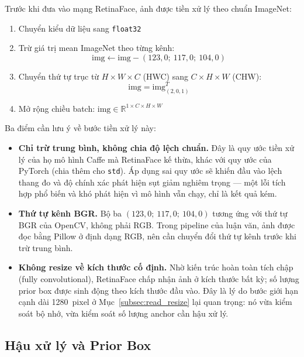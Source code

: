 Trước khi đưa vào mạng RetinaFace, ảnh được tiền xử lý theo chuẩn ImageNet:

\begin{enumerate}
    \item Chuyển kiểu dữ liệu sang \texttt{float32}
    \item Trừ giá trị mean ImageNet theo từng kênh:
    \begin{equation}
    \label{eq:imagenet_mean}
    \text{img} \leftarrow \text{img} - (123{,}0;\ 117{,}0;\ 104{,}0)
    \end{equation}
    \item Chuyển thứ tự trục từ $H \times W \times C$ (HWC) sang $C \times H \times W$ (CHW):
    \begin{equation}
    \label{eq:hwc2chw}
    \text{img} = \text{img}^{T}_{(2,0,1)}
    \end{equation}
    \item Mở rộng chiều batch: $\text{img} \in \mathbb{R}^{1 \times C \times H \times W}$
\end{enumerate}

Ba điểm cần lưu ý về bước tiền xử lý này:

\begin{itemize}
    \item \textbf{Chỉ trừ trung bình, không chia độ lệch chuẩn.} Đây là quy ước tiền xử lý của họ mô hình Caffe mà RetinaFace kế thừa, khác với quy ước của PyTorch (chia thêm cho \texttt{std}). Áp dụng sai quy ước sẽ khiến đầu vào lệch thang đo và độ chính xác phát hiện sụt giảm nghiêm trọng --- một lỗi tích hợp phổ biến và khó phát hiện vì mô hình vẫn chạy, chỉ là kết quả kém.
    \item \textbf{Thứ tự kênh BGR.} Bộ ba $(123{,}0;\ 117{,}0;\ 104{,}0)$ tương ứng với thứ tự BGR của OpenCV, không phải RGB. Trong pipeline của luận văn, ảnh được đọc bằng Pillow ở định dạng RGB, nên cần chuyển đổi thứ tự kênh trước khi trừ trung bình.
    \item \textbf{Không resize về kích thước cố định.} Nhờ kiến trúc hoàn toàn tích chập (fully convolutional), RetinaFace chấp nhận ảnh ở kích thước bất kỳ; số lượng prior box được sinh động theo kích thước đầu vào. Đây là lý do bước giới hạn cạnh dài 1280~pixel ở Mục~\ref{subsec:read_resize} lại quan trọng: nó vừa kiểm soát bộ nhớ, vừa kiểm soát số lượng anchor cần hậu xử lý.
\end{itemize}

\subsection{Hậu xử lý và Prior Box}
\label{subsec:retinaface_postprocess}

